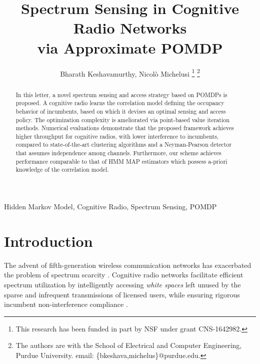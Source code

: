 \documentclass[10pt,twocolumn]{IEEEtran}
\title{Spectrum Sensing in Cognitive Radio Networks
\\
via Approximate POMDP}
\author{Bharath Keshavamurthy, Nicol\`{o} Michelusi
\thanks{This research has been funded in part by NSF under grant CNS-1642982.}
\thanks{The authors are with the School of Electrical and Computer Engineering, Purdue University. email: \{bkeshava,michelus\}@purdue.edu.}
\vspace{-12mm}}
\begin{document}
\maketitle
\thispagestyle{empty}
\pagestyle{empty} 
\begin{abstract}
In this letter, a novel spectrum sensing and access strategy based on POMDPs is proposed. A cognitive radio learns the correlation model defining the occupancy behavior of incumbents, based on which it devises an optimal sensing and access policy. The optimization complexity is ameliorated via point-based value iteration methods. Numerical evaluations demonstrate that the proposed framework achieves higher throughput for cognitive radios, with lower interference to incumbents, compared to state-of-the-art clustering algorithms and a Neyman-Pearson detector that assumes independence among channels. Furthermore, our scheme achieves performance comparable to that of HMM MAP estimators which possess a-priori knowledge of the correlation model.
\end{abstract}
\begin{IEEEkeywords}
Hidden Markov Model, Cognitive Radio, Spectrum Sensing, POMDP
\end{IEEEkeywords}
\vspace{-4mm}
\section{Introduction}\label{I}
The advent of fifth-generation wireless communication networks has exacerbated the problem of spectrum scarcity \cite{7158089}. Cognitive radio networks facilitate efficient spectrum utilization by intelligently accessing \emph{white spaces} left unused by the sparse and infrequent transmissions of licensed users, while ensuring rigorous incumbent non-interference compliance \cite{4562537}. 
\end{document}

